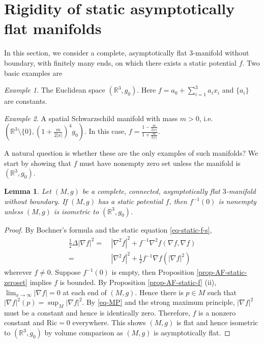 \documentclass[12pt]{amsart}
\newtheorem{lma}{Lemma}[section]
\theoremstyle{remark}
\newtheorem{example}{Example}
\numberwithin{equation}{section}
\newcommand{\Ric}{\mbox{Ric}}
\newcommand{\R}{\mathbb R}
\newcommand{\be}{\begin{equation}}
\newcommand{\ee}{\end{equation}}
\begin{document}
\section{Rigidity of  static asymptotically flat  manifolds}

In this section, we consider a complete,  asymptotically flat $3$-manifold  without boundary,
with finitely many ends, on which there exists a static potential $f$.
Two basic examples  are

\begin{example}
The Euclidean space $ (\R^3 , g_0 )$. Here
$f = a_0 +  \sum_{i=1}^3 a_i x_i $ and $ \{ a_i \} $ are constants.
\end{example}

\begin{example}
A spatial Schwarzschild manifold with  mass $m > 0$, i.e. $ ( \R^3 \setminus \{ 0 \},  ( 1 + \frac{  m}{ 2 | x | }  )^4 g_0 ) $.
In this case, $ f = \frac{ 1 - \frac{ m}{ 2 |x|} }{ 1 + \frac{m}{ 2|x|} }  $.
\end{example}

A natural question is whether these are the only examples of such manifolds?
We start by  showing  that $f$ must have nonempty zero set unless the manifold is
$(\R^3, g_0)$.



\begin{lma}\label{lma-zero-exist}
Let $(M,g)$ be a complete, connected, asymptotically flat $3$-manifold without boundary.
If $(M, g)$ has a static  potential $f$,
then $f^{-1}(0)$ is nonempty unless $(M, g)$ is isometric to $(\R^3, g_0)$.
\end{lma}
\begin{proof}
By  Bochner's formula and  the static equation \eqref{eq-static-f-s},
\be \label{eq-MP}
\begin{split}
 \frac12 \Delta | \nabla f |^2
 = & \ | \nabla^2 f |^2 + f^{-1}  \nabla^2 f ( \nabla f , \nabla f ) \\
  = & \ | \nabla^2 f |^2 + \frac12  f^{-1}  \nabla f ( | \nabla f |^2 )
\end{split}
 \ee
wherever $f \neq 0$.
Suppose  $f^{-1}(0) $ is empty, then  Proposition  \ref{prop-AF-static-zeroset} implies  $f$ is bounded.
By Proposition \ref{prop-AF-static-f} (ii), $\lim_{x\to\infty}|\nabla f|=0$ at each end of $(M, g)$.
Hence there is  $p \in M$ such that $|\nabla f|^2(p)=\sup_M|\nabla f|^2.$
By  \eqref{eq-MP}  and the strong maximum principle, $|\nabla f|^2$ must be a  constant and hence is  identically zero.
Therefore, $f$ is a nonzero constant and $\Ric=0$ everywhere. This shows  $(M, g)$ is flat and hence  isometric to $(\R^3, g_0)$ by volume comparison as $(M, g)$ is asymptotically flat.
\end{proof}
\end{document}

